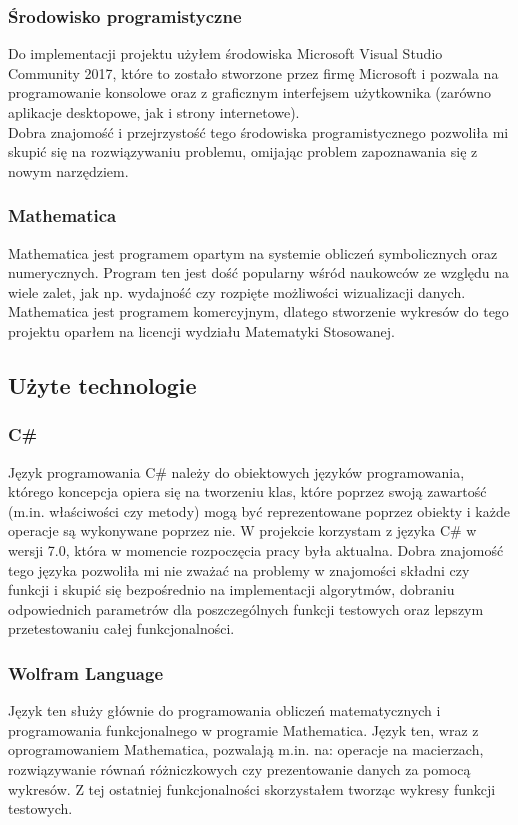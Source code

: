 \documentclass[twoside]{projektInzynierskiMS1}
\newcommand{\si}{ś}
\newcommand{\SI}{Ś}
\begin{document}
	\subsubsection{\SI rodowisko programistyczne}
Do implementacji projektu użyłem \si rodowiska Microsoft Visual Studio Community 2017, które to zostało stworzone przez firmę Microsoft i pozwala na programowanie konsolowe oraz z graficznym interfejsem użytkownika (zarówno aplikacje desktopowe, jak i strony internetowe).  \\
Dobra znajomo\si ć i przejrzysto\si ć tego \si rodowiska programistycznego pozwoliła mi skupić się na rozwiązywaniu problemu, omijając problem zapoznawania się z nowym narzędziem.
	\subsubsection{Mathematica}
	Mathematica jest programem opartym na systemie obliczeń symbolicznych oraz numerycznych. Program ten jest do\si ć popularny w\si ród naukowców ze względu na wiele zalet, jak np. wydajno\si ć czy rozpięte możliwo\si ci wizualizacji danych. Mathematica jest programem komercyjnym, dlatego stworzenie wykresów do tego projektu oparłem na licencji wydziału Matematyki Stosowanej.
	
	\subsection{Użyte technologie}
	\subsubsection{C\#}
Język programowania C\# należy do obiektowych języków programowania, którego koncepcja opiera się na tworzeniu klas, które poprzez swoją zawarto\si ć (m.in. wła\si ciwo\si ci czy metody) mogą być reprezentowane poprzez obiekty i każde operacje są wykonywane poprzez nie. W projekcie korzystam z języka C\# w wersji 7.0, która w momencie rozpoczęcia pracy była aktualna. Dobra znajomo\si ć tego języka pozwoliła mi nie zważać na problemy w znajomo\si ci składni czy funkcji i skupić się bezpo\si rednio na implementacji algorytmów, dobraniu odpowiednich parametrów dla poszczególnych funkcji testowych oraz lepszym przetestowaniu całej funkcjonalno\si ci.

\subsubsection{Wolfram Language}
Język ten służy głównie do programowania obliczeń matematycznych i programowania funkcjonalnego w programie Mathematica. Język ten, wraz z oprogramowaniem Mathematica, pozwalają m.in. na: operacje na macierzach, rozwiązywanie równań różniczkowych czy prezentowanie danych za pomocą wykresów. Z tej ostatniej funkcjonalno\si ci skorzystałem tworząc wykresy funkcji testowych.
\end{document}
